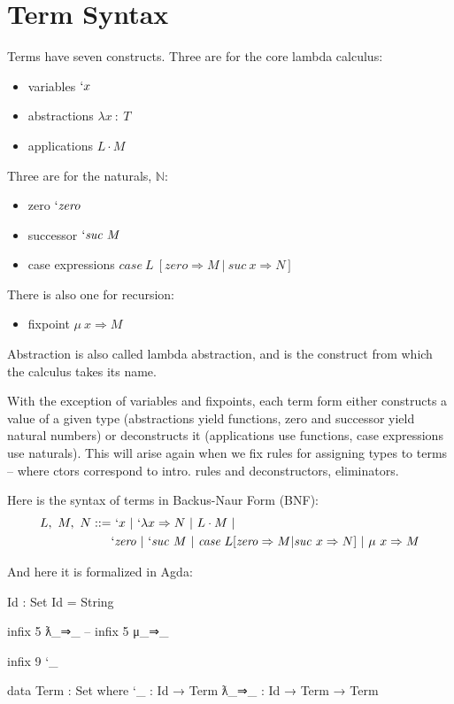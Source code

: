 \documentclass[runningheads]{llncs}
\begin{document}
\section{Term Syntax}

Terms have seven constructs. Three are for the core lambda calculus:
\begin{itemize}
\item variables $`x$ 
\item abstractions $λ x \ : \ T$ 
\item applications $L \cdot M$
\end{itemize}

Three are for the naturals, $\mathbb{N}$:
\begin{itemize}
\item zero $`\mathit{zero}$
\item successor $`\mathit{suc} \ M$ 
\item case expressions $\mathit{case} \ L \ 
[ \mathit{zero} \Rightarrow M \ | \ \mathit{suc} \ x \Rightarrow N ]$ 
\end{itemize}

There is also one for recursion: 
\begin{itemize}
\item fixpoint $\mu \ x \Rightarrow M$
\end{itemize}

Abstraction is also called lambda abstraction, and is the construct from which 
the calculus takes its name.

With the exception of variables and fixpoints, each term form either constructs
a value of a given type (abstractions yield functions, zero and successor yield 
natural numbers) or deconstructs it (applications use functions, case 
expressions use naturals). This will arise again when we fix rules for assigning
types to terms -- where ctors correspond to intro. rules and deconstructors, 
eliminators.

Here is the syntax of terms in Backus-Naur Form (BNF):
\begin{align*}
L, \ M, \ N ::= & \ `x \ | \ `\lambda x \Rightarrow N \ | \ L \cdot M \ | \\ 
            & `\mathit{zero} \ | \ `\mathit{suc} \ M \ | \ 
            \textit{case} \ L [ \mathit{zero} \Rightarrow M | \mathit{suc} \ x 
            \Rightarrow N ] \ | \ 
            \mu \ x \Rightarrow M 
\end{align*}

And here it is formalized in Agda:
\begin{code}
Id : Set
Id = String

infix 5 ƛ_⇒_
-- infix 5 μ_⇒_

infix 9 `_

data Term : Set where 
    `_              : Id → Term
    ƛ_⇒_            : Id → Term → Term 

\end{code}
\end{document}

